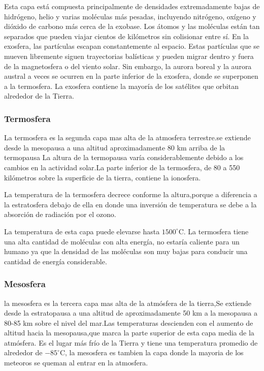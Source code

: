\documentclass{article} %
\begin{document}
Esta capa está compuesta principalmente de densidades extremadamente bajas de hidrógeno, helio y varias moléculas más pesadas, incluyendo nitrógeno, oxígeno y dióxido de carbono más cerca de la exobase. Los átomos y las moléculas están tan separados que pueden viajar cientos de kilómetros sin colisionar entre sí.
En la exosfera, las partículas escapan constantemente al espacio. Estas partículas que se mueven libremente siguen trayectorias balísticas y pueden migrar dentro y fuera de la magnetosfera o del viento solar.
Sin embargo, la aurora boreal y la aurora austral a veces se ocurren en la parte inferior de la exosfera, donde se superponen a la termosfera. La exosfera contiene la mayoría de los satélites que orbitan alrededor de la Tierra.

\subsubsection{Termosfera}
La termosfera es la segunda capa mas alta de la atmosfera terrestre.se extiende desde la mesopausa a una altitud aproximadamente 80 km arriba de la termopausa La altura de la termopausa varía considerablemente debido a los cambios en la actividad solar.La parte inferior de la termosfera, de 80 a 550 kilómetros sobre la superficie de la tierra, contiene la ionosfera.

La temperatura de la termosfera decrece conforme la altura,porque a diferencia a la estratosfera debajo de ella en donde una inversión de temperatura se debe a la absorción de radiación por el ozono.

La temperatura de esta capa puede elevarse hasta $1500^\circ$C.
La termosfera tiene una alta cantidad de moléculas con alta energía,
no estaría caliente para un humano ya que la densidad de las moléculas son muy bajas para conducir una cantidad de energía considerable.
\subsubsection{Mesosfera}
la mesosfera es la tercera capa mas alta de la atmósfera de la tierra,Se extiende desde la estratopausa a una altitud de aproximadamente 50 km a la mesopausa a 80-85 km sobre el nivel del mar.Las temperaturas descienden con el aumento de altitud hacia la mesopausa,que marca la parte superior de esta capa media de la atmósfera. Es el lugar más frío de la Tierra y tiene una temperatura promedio de alrededor de $-85^\circ$C,
la mesosfera es tambien la capa donde la mayoria de los meteoros se queman al entrar en la atmosfera.
\end{document}
